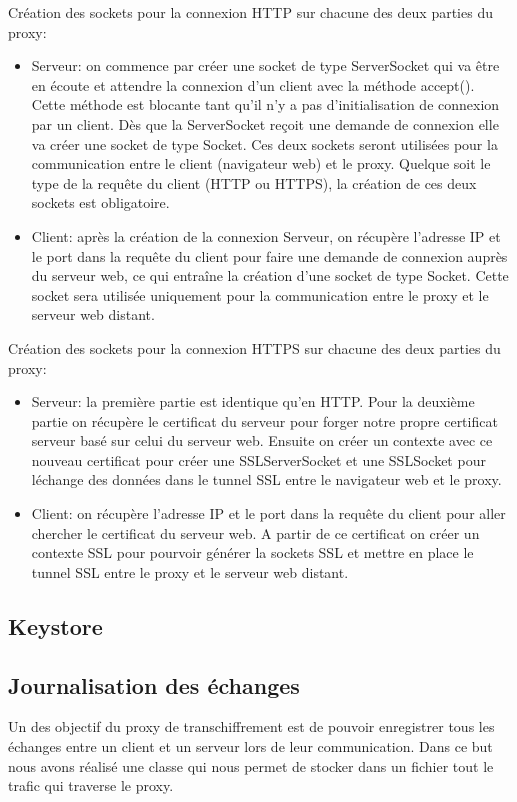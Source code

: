 \documentclass[a4paper,11pt,french]{report}
\begin{document}
Création des sockets pour la connexion HTTP sur chacune des deux parties du proxy:
\begin{itemize}
  \item Serveur: on commence par créer une socket de type ServerSocket qui va 
  être en écoute et attendre la connexion d'un client avec la méthode accept(). 
  Cette méthode est blocante tant qu'il n'y a pas d'initialisation de connexion 
  par un client. Dès que la ServerSocket reçoit une demande de connexion
  elle va créer une socket de type Socket. Ces deux sockets seront utilisées pour la communication entre le client (navigateur web) et le proxy.
  Quelque soit le type de la requête du client (HTTP ou HTTPS), la 
  création de ces deux sockets est obligatoire.
  
  \item Client: après la création de la connexion Serveur, on récupère 
  l'adresse IP et le port dans la requête du client pour faire une demande de 
  connexion auprès du serveur web, ce qui entraîne la création d'une socket de 
  type Socket. Cette socket sera utilisée uniquement pour la communication entre 
  le proxy et le serveur web distant. 
\end{itemize}

Création des sockets pour la connexion HTTPS sur chacune des deux parties du proxy:
\begin{itemize}
  \item Serveur: la première partie est identique qu'en HTTP. Pour la deuxième 
  partie on récupère le certificat du serveur pour forger notre propre 
  certificat serveur basé sur celui du serveur web. Ensuite on créer un contexte 
  avec ce nouveau certificat pour créer une SSLServerSocket et une SSLSocket 
  pour léchange des données dans le tunnel SSL entre le navigateur web et le 
  proxy.
  
  \item Client: on récupère l'adresse IP et le port dans la requête du client 
  pour aller chercher le certificat du serveur web. A partir de ce certificat on 
  créer un contexte SSL pour pourvoir générer la sockets SSL et mettre en place 
  le tunnel SSL entre le proxy et le serveur web distant.
\end{itemize}

\subsection{Keystore}


\subsection{Journalisation des échanges}
Un des objectif du proxy de transchiffrement est de pouvoir enregistrer tous les 
échanges entre un client et un serveur lors de leur communication. Dans ce but nous
avons réalisé une classe qui nous permet de stocker dans un fichier tout le trafic qui traverse le proxy.
\end{document}
